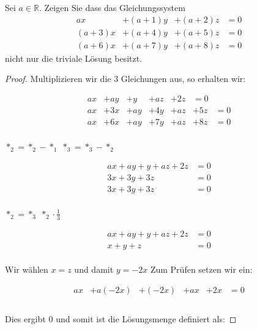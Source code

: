\documentclass[12pt, letterpaper]{article}
\begin{document}
Sei $a \in \mathbb{R}$. Zeigen Sie dass das Gleichungssystem
\[
\begin{aligned}
    ax &+ (a + 1)y &+ (a + 2)z &= 0 \\
    (a + 3)x &+ (a + 4)y &+ (a + 5)z &= 0 \\
    (a + 6)x &+ (a + 7)y &+ (a + 8)z &= 0
\end{aligned}
\]
nicht nur die triviale Lösung besitzt.

\begin{proof}

Multiplizieren wir die 3 Gleichungen aus, so erhalten wir:

\[
\begin{aligned}
    ax &+ ay &+ y &+ az &+ 2z &= 0 \\
    ax &+ 3x &+ ay &+ 4y &+ az &+ 5z &= 0 \\
    ax &+ 6x &+ ay &+7y &+ az &+ 8z &= 0
\end{aligned}
\]\\

\noindent $\ast_2 = \ast_2 - \ast_1$\newline
\noindent $\ast_3 = \ast_3 - \ast_2$

\[
\begin{aligned}
    ax + ay + y + az + 2z &= 0 \\
    3x + 3y + 3z &= 0 \\
    3x + 3y + 3z &= 0
\end{aligned}
\]\\

\noindent $\ast_2 = \ast_3$\newline
\noindent $\ast_2 \cdot \frac{1}{3}$

\[
\begin{aligned}
    ax + ay + y + az + 2z &= 0 \\
    x + y + z &= 0
\end{aligned}
\]\\

\noindent Wir wählen $x = z$ und damit $y = -2x$\newline
\noindent Zum Prüfen setzen wir ein:

\[
\begin{aligned}
    ax &+ a(-2x) &+ (-2x) &+ ax &+ 2x &= 0 \\
\end{aligned}
\]\\

\noindent Dies ergibt 0 und somit ist die Lösungsmenge definiert als:


\end{proof}
\end{document}
